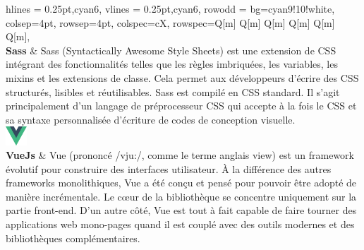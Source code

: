 \begin{longtblr}[caption={Technologies utilisées au niveau du front-end}]{
    hlines = {0.25pt,cyan6},
    vlines = {0.25pt,cyan6},
    row{odd} = {bg=cyan9!10!white},
    colsep=4pt,
    rowsep=4pt,
	colspec={cX},
    rowspec={Q[m] Q[m] Q[m] Q[m] Q[m] Q[m]},
}
{ \\\textbf{Sass}
 }
 & Sass (Syntactically Awesome Style Sheets) est une extension de CSS intégrant des fonctionnalités telles que les règles imbriquées, les variables, les mixins et les extensions de classe. Cela permet aux développeurs d'écrire des CSS structurés, lisibles et réutilisables. Sass est compilé en CSS standard. Il s'agit principalement d'un langage de préprocesseur CSS qui accepte à la fois le CSS et sa syntaxe personnalisée d'écriture de codes de conception visuelle.\\
{\includegraphics[width=8mm]{images/sec5/vue.pdf} \\\textbf{VueJs}
} & Vue (prononcé /vju:/, comme le terme anglais view) est un framework évolutif pour construire des interfaces utilisateur. À la différence des autres frameworks monolithiques, Vue a été conçu et pensé pour pouvoir être adopté de manière incrémentale. Le cœur de la bibliothèque se concentre uniquement sur la partie front-end. D’un autre côté, Vue est tout à fait capable de faire tourner des applications web mono-pages quand il est couplé avec des outils modernes et des bibliothèques complémentaires.\\
\end{longtblr}

